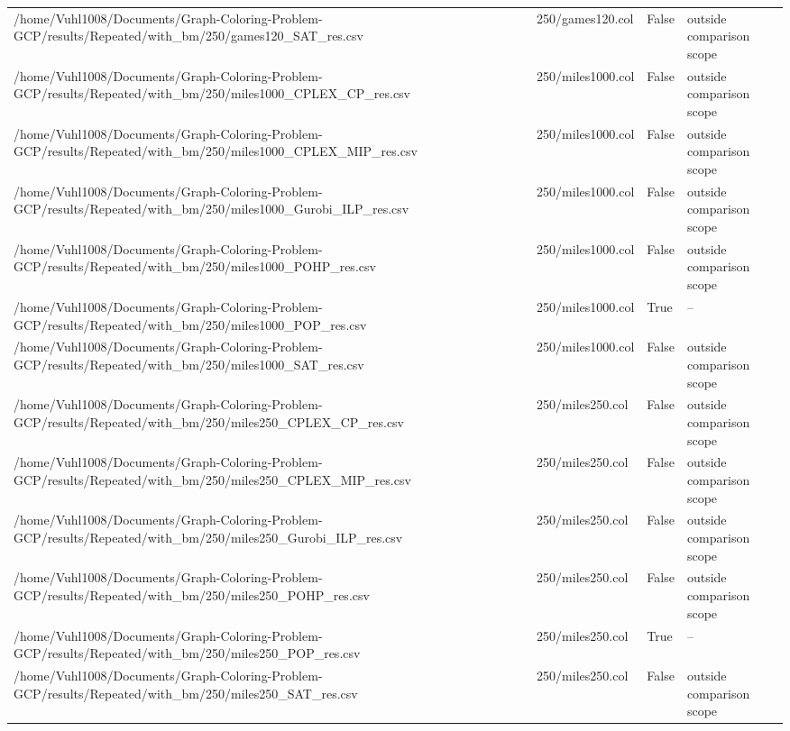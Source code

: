 \begin{table}[htbp]
\begin{tabular}{llll}
/home/Vuhl1008/Documents/Graph-Coloring-Problem-GCP/results/Repeated/with\_bm/250/games120\_SAT\_res.csv & 250/games120.col & False & outside comparison scope \\
/home/Vuhl1008/Documents/Graph-Coloring-Problem-GCP/results/Repeated/with\_bm/250/miles1000\_CPLEX\_CP\_res.csv & 250/miles1000.col & False & outside comparison scope \\
/home/Vuhl1008/Documents/Graph-Coloring-Problem-GCP/results/Repeated/with\_bm/250/miles1000\_CPLEX\_MIP\_res.csv & 250/miles1000.col & False & outside comparison scope \\
/home/Vuhl1008/Documents/Graph-Coloring-Problem-GCP/results/Repeated/with\_bm/250/miles1000\_Gurobi\_ILP\_res.csv & 250/miles1000.col & False & outside comparison scope \\
/home/Vuhl1008/Documents/Graph-Coloring-Problem-GCP/results/Repeated/with\_bm/250/miles1000\_POHP\_res.csv & 250/miles1000.col & False & outside comparison scope \\
/home/Vuhl1008/Documents/Graph-Coloring-Problem-GCP/results/Repeated/with\_bm/250/miles1000\_POP\_res.csv & 250/miles1000.col & True & -- \\
/home/Vuhl1008/Documents/Graph-Coloring-Problem-GCP/results/Repeated/with\_bm/250/miles1000\_SAT\_res.csv & 250/miles1000.col & False & outside comparison scope \\
/home/Vuhl1008/Documents/Graph-Coloring-Problem-GCP/results/Repeated/with\_bm/250/miles250\_CPLEX\_CP\_res.csv & 250/miles250.col & False & outside comparison scope \\
/home/Vuhl1008/Documents/Graph-Coloring-Problem-GCP/results/Repeated/with\_bm/250/miles250\_CPLEX\_MIP\_res.csv & 250/miles250.col & False & outside comparison scope \\
/home/Vuhl1008/Documents/Graph-Coloring-Problem-GCP/results/Repeated/with\_bm/250/miles250\_Gurobi\_ILP\_res.csv & 250/miles250.col & False & outside comparison scope \\
/home/Vuhl1008/Documents/Graph-Coloring-Problem-GCP/results/Repeated/with\_bm/250/miles250\_POHP\_res.csv & 250/miles250.col & False & outside comparison scope \\
/home/Vuhl1008/Documents/Graph-Coloring-Problem-GCP/results/Repeated/with\_bm/250/miles250\_POP\_res.csv & 250/miles250.col & True & -- \\
/home/Vuhl1008/Documents/Graph-Coloring-Problem-GCP/results/Repeated/with\_bm/250/miles250\_SAT\_res.csv & 250/miles250.col & False & outside comparison scope \\

\end{tabular}
\end{table}
